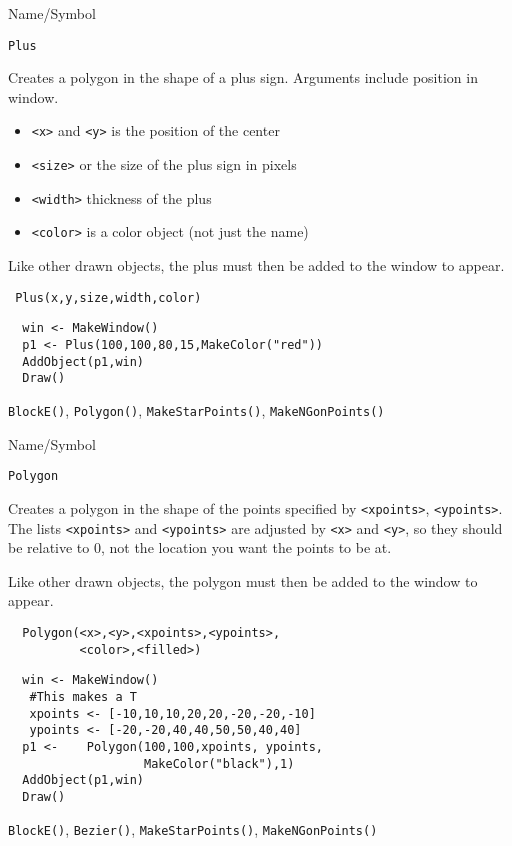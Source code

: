 \begin{desc}{Name/Symbol}
\item[Name/Symbol]  	\verb+Plus+ 

\item[Description] Creates a polygon in the shape of a
 plus sign. Arguments include position in window.
\begin{itemize}
\item \verb+<x>+ and \verb+<y>+ is the position of the center
\item \verb+<size>+ or the size of the plus sign in pixels
\item \verb+<width>+ thickness of the plus
\item \verb+<color>+ is a color object (not just the name)
\end{itemize}

Like other drawn objects, the plus must then be added to the window
to appear.

\item[Usage]		
\begin{verbatim}
 Plus(x,y,size,width,color)
\end{verbatim}

\item[Example]	
\begin{verbatim}
  win <- MakeWindow()
  p1 <- Plus(100,100,80,15,MakeColor("red"))
  AddObject(p1,win)
  Draw()
\end{verbatim}

\item[See Also]   
\verb+BlockE()+, \verb+Polygon()+, \verb+MakeStarPoints()+,
\verb+MakeNGonPoints()+
\end{desc}

\begin{desc}{Name/Symbol}
\item[Name/Symbol]  	\verb+Polygon+ 

\item[Description] Creates a polygon in the shape of the points
specified by \verb+<xpoints>+, \verb+<ypoints>+. The lists \verb+<xpoints>+ and
\verb+<ypoints>+ are adjusted by  \verb+<x>+ and \verb+<y>+, so they
should be relative to 0, not the location you want the points to be at.

Like other drawn objects, the polygon must then be added to the window
to appear.

\item[Usage]		
\begin{verbatim}
  Polygon(<x>,<y>,<xpoints>,<ypoints>,
          <color>,<filled>)
\end{verbatim}

\item[Example]	
\begin{verbatim}
  win <- MakeWindow()
   #This makes a T
   xpoints <- [-10,10,10,20,20,-20,-20,-10]
   ypoints <- [-20,-20,40,40,50,50,40,40]
  p1 <-    Polygon(100,100,xpoints, ypoints,
                   MakeColor("black"),1)
  AddObject(p1,win)
  Draw()
\end{verbatim}

\item[See Also]   
\verb+BlockE()+, \verb+Bezier()+, \verb+MakeStarPoints()+,
\verb+MakeNGonPoints()+
\end{desc}

